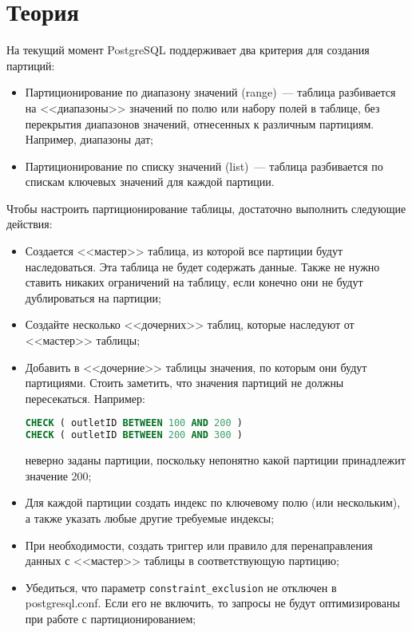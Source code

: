 \section{Теория}

На текущий момент PostgreSQL поддерживает два критерия для создания партиций:

\begin{itemize}
  \item Партиционирование по диапазону значений (range)~--- таблица разбивается на <<диапазоны>> значений по полю или набору полей в таблице, без перекрытия диапазонов значений, отнесенных к различным партициям. Например, диапазоны дат;
  \item Партиционирование по списку значений (list)~--- таблица разбивается по спискам ключевых значений для каждой партиции.
\end{itemize}

Чтобы настроить партиционирование таблицы, достаточно выполнить следующие действия:

\begin{itemize}
  \item Создается <<мастер>> таблица, из которой все партиции будут наследоваться. Эта таблица не будет содержать данные. Также не нужно ставить никаких ограничений на таблицу, если конечно они не будут дублироваться на партиции;
  \item Создайте несколько <<дочерних>> таблиц, которые наследуют от <<мастер>> таблицы;
  \item Добавить в <<дочерние>> таблицы значения, по которым они будут партициями. Стоить заметить, что значения партиций не должны пересекаться. Например:

\begin{lstlisting}[language=SQL,label=lst:partitioning1,caption=Пример неверного задания значений партиций]
CHECK ( outletID BETWEEN 100 AND 200 )
CHECK ( outletID BETWEEN 200 AND 300 )
\end{lstlisting}

  неверно заданы партиции, поскольку непонятно какой партиции принадлежит значение 200;
  \item Для каждой партиции создать индекс по ключевому полю (или нескольким), а также указать любые другие требуемые индексы;
  \item При необходимости, создать триггер или правило для перенаправления данных с <<мастер>> таблицы в соответствующую партицию;
  \item Убедиться, что параметр \lstinline!constraint_exclusion! не отключен в postgresql.conf. Если его не включить, то запросы не будут оптимизированы при работе с партиционированием;
\end{itemize}

